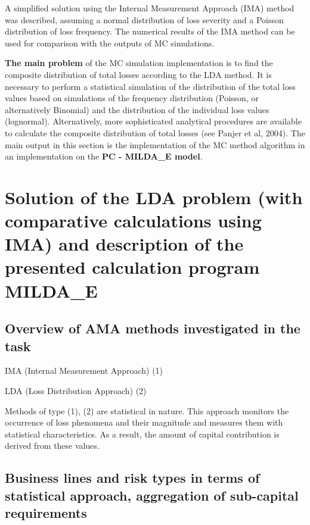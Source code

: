 \documentclass{article}
\begin{document}
A simplified solution using the Internal Measurement Approach (IMA) method was described, assuming a normal distribution of loss severity and a Poisson distribution of loss frequency. The numerical results of the IMA method can be used for comparison with the outputs of MC simulations.

\textbf{The main problem} of the MC simulation implementation is to find the composite distribution of total losses according to the LDA method. It is necessary to perform a statistical simulation of the distribution of the total loss values based on simulations of the frequency distribution (Poisson, or alternatively Binomial) and the distribution of the individual loss values (lognormal). Alternatively, more sophisticated analytical procedures are available to calculate the composite distribution of total losses (see Panjer et al, 2004).
The main output in this section is the implementation of the MC method algorithm in an implementation on the \textbf{PC - MILDA\_E model}.


\section{Solution of the LDA problem (with comparative calculations using IMA) and description of the presented calculation program MILDA\_E}

\subsection{Overview of AMA methods investigated in the task}

\begin{compactitem}
\item IMA (Internal Measurement Approach)				(1)
\item LDA (Loss Distribution Approach)				(2)
\end{compactitem}

Methods of type (1), (2) are statistical in nature. This approach monitors the occurrence of loss phenomena and their magnitude and measures them with statistical characteristics. As a result, the amount of capital contribution is derived from these values.


\subsection{Business lines and risk types in terms of statistical approach, aggregation of sub-capital requirements}
\end{document}
